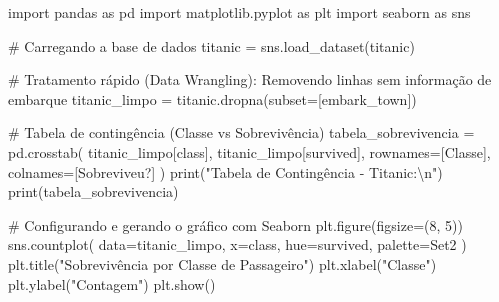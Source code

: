 \documentclass[
  brazilian,
  letterpaper,
  DIV=11,
  numbers=noendperiod]{scrreprt}
\newenvironment{Shaded}{\begin{snugshade}}{\end{snugshade}}
\newcommand{\BuiltInTok}[1]{\textcolor[rgb]{0.00,0.23,0.31}{#1}}
\newcommand{\CharTok}[1]{\textcolor[rgb]{0.13,0.47,0.30}{#1}}
\newcommand{\CommentTok}[1]{\textcolor[rgb]{0.37,0.37,0.37}{#1}}
\newcommand{\DecValTok}[1]{\textcolor[rgb]{0.68,0.00,0.00}{#1}}
\newcommand{\ImportTok}[1]{\textcolor[rgb]{0.00,0.46,0.62}{#1}}
\newcommand{\NormalTok}[1]{\textcolor[rgb]{0.00,0.23,0.31}{#1}}
\newcommand{\OperatorTok}[1]{\textcolor[rgb]{0.37,0.37,0.37}{#1}}
\newcommand{\StringTok}[1]{\textcolor[rgb]{0.13,0.47,0.30}{#1}}
\begin{document}
\begin{Shaded}
\begin{Highlighting}[]
\ImportTok{import}\NormalTok{ pandas }\ImportTok{as}\NormalTok{ pd}
\ImportTok{import}\NormalTok{ matplotlib.pyplot }\ImportTok{as}\NormalTok{ plt}
\ImportTok{import}\NormalTok{ seaborn }\ImportTok{as}\NormalTok{ sns}

\CommentTok{\# Carregando a base de dados}
\NormalTok{titanic }\OperatorTok{=}\NormalTok{ sns.load\_dataset(}\StringTok{\textquotesingle{}titanic\textquotesingle{}}\NormalTok{)}

\CommentTok{\# Tratamento rápido (Data Wrangling): Removendo linhas sem informação de embarque}
\NormalTok{titanic\_limpo }\OperatorTok{=}\NormalTok{ titanic.dropna(subset}\OperatorTok{=}\NormalTok{[}\StringTok{\textquotesingle{}embark\_town\textquotesingle{}}\NormalTok{])}

\CommentTok{\# Tabela de contingência (Classe vs Sobrevivência)}
\NormalTok{tabela\_sobrevivencia }\OperatorTok{=}\NormalTok{ pd.crosstab(}
\NormalTok{    titanic\_limpo[}\StringTok{\textquotesingle{}class\textquotesingle{}}\NormalTok{], }
\NormalTok{    titanic\_limpo[}\StringTok{\textquotesingle{}survived\textquotesingle{}}\NormalTok{], }
\NormalTok{    rownames}\OperatorTok{=}\NormalTok{[}\StringTok{\textquotesingle{}Classe\textquotesingle{}}\NormalTok{], }
\NormalTok{    colnames}\OperatorTok{=}\NormalTok{[}\StringTok{\textquotesingle{}Sobreviveu?\textquotesingle{}}\NormalTok{]}
\NormalTok{)}
\BuiltInTok{print}\NormalTok{(}\StringTok{"Tabela de Contingência {-} Titanic:}\CharTok{\textbackslash{}n}\StringTok{"}\NormalTok{)}
\BuiltInTok{print}\NormalTok{(tabela\_sobrevivencia)}

\CommentTok{\# Configurando e gerando o gráfico com Seaborn}
\NormalTok{plt.figure(figsize}\OperatorTok{=}\NormalTok{(}\DecValTok{8}\NormalTok{, }\DecValTok{5}\NormalTok{))}
\NormalTok{sns.countplot(}
\NormalTok{    data}\OperatorTok{=}\NormalTok{titanic\_limpo, }
\NormalTok{    x}\OperatorTok{=}\StringTok{\textquotesingle{}class\textquotesingle{}}\NormalTok{, }
\NormalTok{    hue}\OperatorTok{=}\StringTok{\textquotesingle{}survived\textquotesingle{}}\NormalTok{, }
\NormalTok{    palette}\OperatorTok{=}\StringTok{\textquotesingle{}Set2\textquotesingle{}}
\NormalTok{)}
\NormalTok{plt.title(}\StringTok{"Sobrevivência por Classe de Passageiro"}\NormalTok{)}
\NormalTok{plt.xlabel(}\StringTok{"Classe"}\NormalTok{)}
\NormalTok{plt.ylabel(}\StringTok{"Contagem"}\NormalTok{)}
\NormalTok{plt.show()}
\end{Highlighting}
\end{Shaded}
\end{document}
